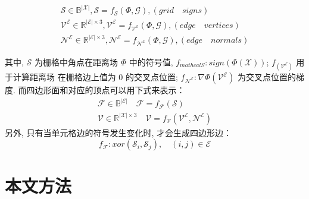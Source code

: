 \begin{align}\label{a}
\mathcal{S}\in \mathbb{B}^{|\mathcal{X}|},  \mathcal{S}=f_{\mathcal{S}}(\Phi,\mathcal{G}),  (grid \quad signs) \\
\mathcal{V}^\mathcal{E}\in\mathbb{R}^{|\mathcal{E}|\times 3}, \mathcal{V}^\mathcal{E}=f_{\mathcal{V}^\mathcal{E}}(\Phi,\mathcal{G}), (edge\quad vertices)\\
\mathcal{N}^\mathcal{E}\in\mathbb{R}^{|\mathcal{E}|\times 3},
\mathcal{N}^\mathcal{E}=f_{\mathcal{N}^\mathcal{E}}(\Phi,\mathcal{G}), (edge\quad normals)
\end{align}


其中, $\mathcal{S}$ 为栅格中角点在距离场 $\Phi$ 中的符号值, $ f_{mathcal{S}}: sign(\Phi(\mathcal{X}))$; $f_(\mathcal{V}^\mathcal{E})$ 用于计算距离场 在栅格边上值为 0 的交叉点位置; $f_\mathcal{N^E}:\nabla \Phi(\mathcal{V^E})$  为交叉点位置的梯度. 而四边形面和对应的顶点可以用下式来表示：
\begin{align}
    \mathcal{F}\in \mathbb{B}^{|\mathcal{E}|} \quad \mathcal{F}=f_{\mathcal{F}}(\mathcal{S}) \\
    \mathcal{V} \in \mathbb{R}^{|\mathcal{X}| \times 3} \quad \mathcal{V}=f_{\mathcal{V}}(\mathcal{V}^{\mathcal{E}}, \mathcal{N}^{\mathcal{E}})
\end{align}
另外, 只有当单元格边的符号发生变化时, 才会生成四边形边：
\begin{equation}
    f_{\mathcal{F}}:xor(\mathcal{S}_i, \mathcal{S}_j), \quad (i, j)\in \mathcal{E}
\end{equation}




\section{本文方法}

